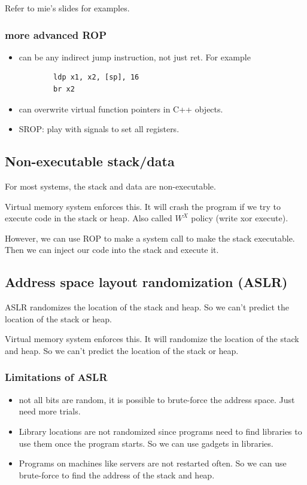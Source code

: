 \documentclass[letterpaper,12pt]{article}
\begin{document}
Refer to mie's slides for examples.
\subsubsection{more advanced ROP}
\begin{itemize}
    \item can be any indirect jump instruction, not just ret. For example \begin{lstlisting}
        ldp x1, x2, [sp], 16
        br x2
    \end{lstlisting}
    \item can overwrite virtual function pointers in C++ objects.
    \item SROP: play with signals to set all registers.
\end{itemize}

\subsection{Non-executable stack/data}
For most systems, the stack and data are non-executable.

Virtual memory system enforces this. It will crash the program if we try to
execute code in the stack or heap. Also called $W^X$ policy (write xor
execute).

However, we can use ROP to make a system call to make the stack executable.
Then we can inject our code into the stack and execute it.

\subsection{Address space layout randomization (ASLR)}
ASLR randomizes the location of the stack and heap. So we can't predict the
location of the stack or heap.

Virtual memory system enforces this. It will randomize the location of the
stack and heap. So we can't predict the location of the stack or heap.

\subsubsection{Limitations of ASLR}
\begin{itemize}
    \item not all bits are random, it is possible to brute-force the address space. Just
          need more trials.
    \item Library locations are not randomized since programs need to find libraries to
          use them once the program starts. So we can use gadgets in libraries.
    \item Programs on machines like servers are not restarted often. So we can use
          brute-force to find the address of the stack and heap.
\end{itemize}
\end{document}
